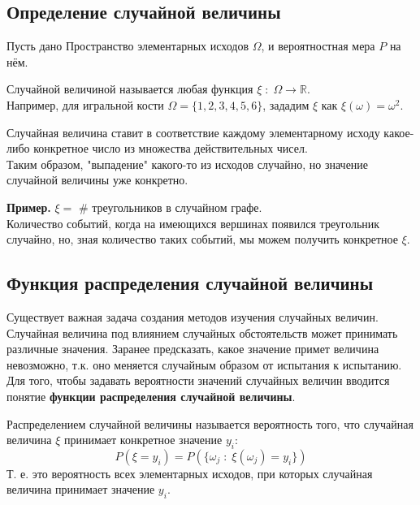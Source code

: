 \subsection{Определение случайной величины}

Пусть дано Пространство элементарных исходов $\Omega$, и вероятностная мера $P$ на нём.

\begin{definition}
    Случайной величиной называется любая функция $\xi \; : \; \Omega \rightarrow \mathbb{R}$. \\
    Например, для игральной кости $\Omega = \{1,2,3,4,5,6\}$, зададим $\xi$ как $\xi(\omega) = \omega^2$.
\end{definition}

Случайная величина ставит в соответствие каждому элементарному исходу какое-либо конкретное число из множества действительных чисел. \\
Таким образом, "выпадение" какого-то из исходов случайно, но значение случайной величины уже конкретно.

\textbf{Пример.} $\xi =$ $\#$ треугольников в случайном графе. \\
Количество событий, когда на имеющихся вершинах появился треугольник случайно, но, зная количество таких событий, мы можем получить конкретное $\xi$.

\subsection{Функция распределения случайной величины}

Существует важная задача создания методов изучения случайных величин. \\
Случайная величина под влиянием случайных обстоятельств может принимать различные значения. Заранее предсказать, какое значение примет величина невозможно, т.к. оно меняется случайным образом от испытания к испытанию. \\
Для того, чтобы задавать вероятности значений случайных величин вводится понятие \textbf{функции распределения случайной величины}.

\begin{definition}
    Распределением случайной величины называется вероятность того, что случайная величина $\xi$ принимает конкретное значение $y_i$:
    \begin{equation}
        P(\xi = y_i) = P(\{\omega_j \; : \; \xi(\omega_j) = y_i\})
    \end{equation}
Т. е. это вероятность всех элементарных исходов, при которых случайная величина принимает значение $y_i$.
\end{definition}

